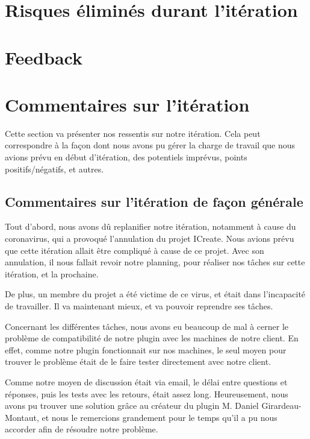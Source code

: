 \documentclass[12pt,titlepage,french]{article}
\begin{document}
\section{Risques éliminés durant l'itération}


\section{Feedback}

\section{Commentaires sur l'itération}

Cette section va présenter nos ressentis sur notre itération. Cela peut correspondre à la façon dont nous avons pu gérer la charge de travail que nous avions prévu en début d'itération, des potentiels imprévus, points positifs/négatifs, et autres.

\subsection{Commentaires sur l'itération de façon générale}

Tout d'abord, nous avons dû replanifier notre itération, notamment à cause du coronavirus, qui a provoqué l'annulation du projet ICreate. Nous avions prévu que cette itération allait être compliqué à cause de ce projet. Avec son annulation, il nous fallait revoir notre planning, pour réaliser nos tâches sur cette itération, et la prochaine. \newline

De plus, un membre du projet a été victime de ce virus, et était dans l'incapacité de travailler. Il va maintenant mieux, et va pouvoir reprendre ses tâches. \newline

Concernant les différentes tâches, nous avons eu beaucoup de mal à cerner le problème de compatibilité de notre plugin avec les machines de notre client. En effet, comme notre plugin fonctionnait sur nos machines, le seul moyen pour trouver le problème était de le faire tester directement avec notre client. \newline

Comme notre moyen de discussion était via email, le délai entre questions et réponses, puis les tests avec les retours, était assez long. Heureusement, nous avons pu trouver une solution grâce au créateur du plugin M. Daniel Girardeau-Montaut, et nous le remercions grandement pour le temps qu'il a pu nous accorder afin de résoudre notre problème.
\end{document}
